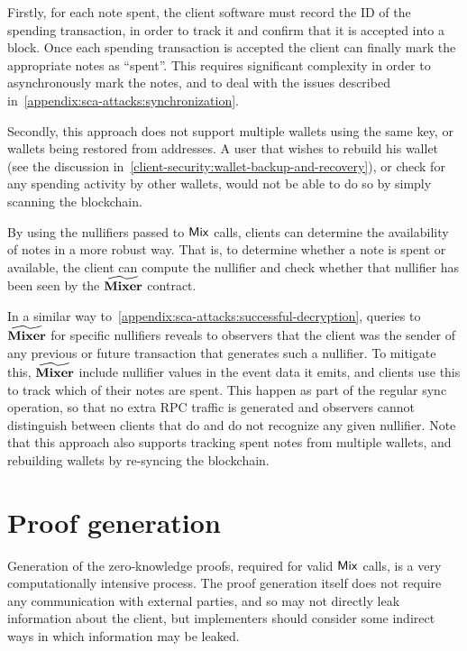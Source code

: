 Firstly, for each note spent, the client software must record the ID of the spending transaction, in order to track it and confirm that it is accepted into a block. Once each spending transaction is accepted the client can finally mark the appropriate \zeth{} notes as ``spent''. This requires significant complexity in order to asynchronously mark the notes, and to deal with the issues described in~\cref{appendix:sca-attacks:synchronization}.

Secondly, this approach does not support multiple wallets using the same key, or wallets being restored from \zeth{} addresses. A user that wishes to rebuild his wallet (see the discussion in~\cref{client-security:wallet-backup-and-recovery}), or check for any spending activity by other wallets, would not be able to do so by simply scanning the blockchain.

By using the nullifiers passed to $\mathsf{Mix}$ calls, clients can determine the availability of notes in a more robust way. That is, to determine whether a note is spent or available, the client can compute the nullifier and check whether that nullifier has been seen by the $\widetilde{\mathbf{Mixer}}$ contract.

In a similar way to~\cref{appendix:sca-attacks:successful-decryption}, queries to $\widetilde{\mathbf{Mixer}}$ for specific nullifiers reveals to observers that the client was the sender of any previous or future transaction that generates such a nullifier. To mitigate this, $\widetilde{\mathbf{Mixer}}$ \MUST{} include nullifier values in the event data it emits, and clients \SHOULD{} use this to track which of their notes are spent. This \MUST{} happen as part of the regular sync operation, so that no extra RPC traffic is generated and observers cannot distinguish between clients that do and do not recognize any given nullifier. Note that this approach also supports tracking spent notes from multiple wallets, and rebuilding wallets by re-syncing the blockchain.

\section{Proof generation}\label{appendix:sca-attacks:proof-generation}

Generation of the zero-knowledge proofs, required for valid $\mathsf{Mix}$ calls, is a very computationally intensive process.
The proof generation itself does not require any communication with external parties, and so may not directly leak information about the client, but implementers should consider some indirect ways in which information may be leaked.

